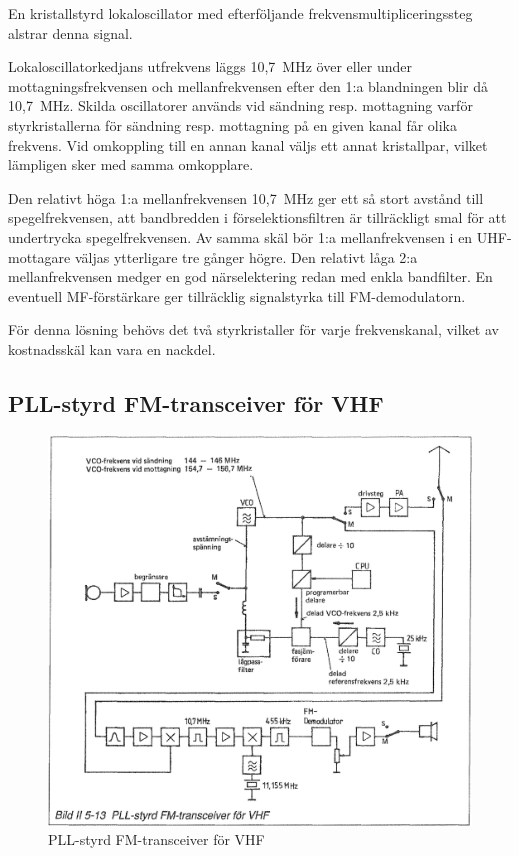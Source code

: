 

En kristallstyrd lokaloscillator med efterföljande
frekvensmultipliceringssteg alstrar denna signal.

Lokaloscillatorkedjans utfrekvens läggs 10,7~MHz över eller under
mottagningsfrekvensen och mellanfrekvensen efter den 1:a blandningen
blir då 10,7~MHz. Skilda oscillatorer används vid sändning
resp. mottagning varför styrkristallerna för sändning resp.
mottagning på en given kanal får olika frekvens. Vid omkoppling till
en annan kanal väljs ett annat kristallpar, vilket lämpligen sker med
samma omkopplare.

Den relativt höga 1:a mellanfrekvensen 10,7~MHz ger ett så stort
avstånd till spegelfrekvensen, att bandbredden i förselektionsfiltren
är tillräckligt smal för att undertrycka spegelfrekvensen. Av samma
skäl bör 1:a mellanfrekvensen i en UHF-mottagare väljas ytterligare
tre gånger högre. Den relativt låga 2:a mellanfrekvensen medger en god
närselektering redan med enkla bandfilter.  En eventuell
MF-förstärkare ger tillräcklig signalstyrka till FM-demodulatorn.

För denna lösning behövs det två styrkristaller för varje
frekvenskanal, vilket av kostnadsskäl kan vara en nackdel.

\subsection{PLL-styrd FM-transceiver för VHF}

\begin{figure}
  \includegraphics[width=\textwidth]{images/bild_2_5-13}
  \caption{PLL-styrd FM-transceiver för VHF}
  \label{fig:bildII5-13}
\end{figure}

